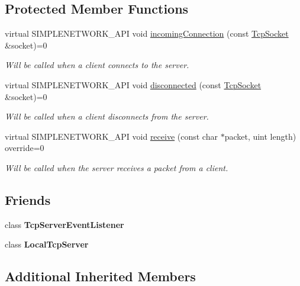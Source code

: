 \subsection*{Protected Member Functions}
\begin{DoxyCompactItemize}
\item 
virtual S\+I\+M\+P\+L\+E\+N\+E\+T\+W\+O\+R\+K\+\_\+\+A\+PI void \mbox{\hyperlink{class_tcp_server_ad6fd71a4984c07d2ca247ca0fe4e1af0}{incoming\+Connection}} (const \mbox{\hyperlink{class_tcp_socket}{Tcp\+Socket}} \&socket)=0
\begin{DoxyCompactList}\small\item\em Will be called when a client connects to the server. \end{DoxyCompactList}\item 
virtual S\+I\+M\+P\+L\+E\+N\+E\+T\+W\+O\+R\+K\+\_\+\+A\+PI void \mbox{\hyperlink{class_tcp_server_a31f65254fdedc53f207906faad2445c9}{disconnected}} (const \mbox{\hyperlink{class_tcp_socket}{Tcp\+Socket}} \&socket)=0
\begin{DoxyCompactList}\small\item\em Will be called when a client disconnects from the server. \end{DoxyCompactList}\item 
virtual S\+I\+M\+P\+L\+E\+N\+E\+T\+W\+O\+R\+K\+\_\+\+A\+PI void \mbox{\hyperlink{class_tcp_server_afb492b671a8960d2969f22a3c9408ba7}{receive}} (const char $\ast$packet, uint length) override=0
\begin{DoxyCompactList}\small\item\em Will be called when the server receives a packet from a client. \end{DoxyCompactList}\end{DoxyCompactItemize}
\subsection*{Friends}
\begin{DoxyCompactItemize}
\item 
\mbox{\label{class_tcp_server_afff21cc973310e3b55b9f25cd8d76bd0}} 
class {\bfseries Tcp\+Server\+Event\+Listener}
\item 
\mbox{\label{class_tcp_server_a31f2ca6d48ea51cd511ab7d877ce0dac}} 
class {\bfseries Local\+Tcp\+Server}
\end{DoxyCompactItemize}
\subsection*{Additional Inherited Members}


